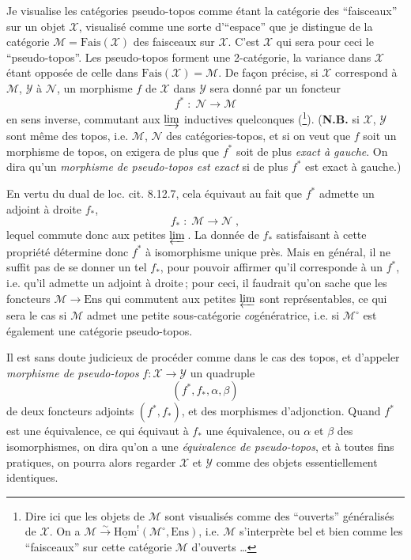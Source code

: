 \documentclass[11pt]{article}
\newcommand{\printedpage}[1]{\marginpar{\footnotesize p.~#1}}
\newcommand{\msp}[1]{\marginpar{\footnotesize [#1]}}
\newcommand{\uHom}{\underline{\mathrm{Hom}}}
\newcommand{\Ens}{\mathrm{Ens}}
\newcommand{\Fais}{\mathrm{Fais}}
\begin{document}
Je visualise les catégories pseudo-topos comme étant la catégorie des “faisceaux” sur un objet $\mathcal{X}$, visualisé comme une sorte d'“espace” que je distingue de la catégorie $\mathcal{M}=\Fais(\mathcal{X})$ des faisceaux sur $\mathcal{X}$. C'est $\mathcal{X}$ qui sera pour ceci le “pseudo-topos”. Les pseudo-topos forment une 2-catégorie, la variance dans $\mathcal{X}$ étant opposée de celle dans $\Fais(\mathcal{X})=\mathcal{M}$. De façon précise, si $\mathcal{X}$ correspond à $\mathcal{M}$, $\mathcal{Y}$ à $\mathcal{N}$, un morphisme $f$ de $\mathcal{X}$ dans $\mathcal{Y}$ sera donné par un foncteur
\[
f^* \;:\; \mathcal{N} \longrightarrow \mathcal{M}
\tag*{(4.1.1)}
\]
en sens inverse, commutant aux $\varinjlim$ inductives quelconques (\footnote{Dire ici que les objets de $\mathcal{M}$ sont visualisés comme des “ouverts” généralisés de $\mathcal{X}$. On a $\mathcal{M}\xrightarrow{\sim}\uHom^!(\mathcal{M}^\circ,\Ens)$, i.e. $\mathcal{M}$ s'interprète bel et bien comme les “faisceaux” sur cette catégorie $\mathcal{M}$ d'ouverts \ldots}). (\textbf{N.B.} si $\mathcal{X}$, $\mathcal{Y}$ sont même des topos, i.e. $\mathcal{M}$, $\mathcal{N}$ des catégories-topos, et si on veut que $f$ soit un morphisme de topos, on exigera de plus que $f^*$ soit de plus \textit{exact à gauche}. On dira qu'un \textit{morphisme de pseudo-topos est exact} si de plus $f^*$ est exact à gauche.)

\msp{page 52}
En vertu du dual de loc. cit. 8.12.7, cela équivaut au fait que $f^*$ admette un adjoint à droite $f_*$,
\[
f_* \;:\; \mathcal{M} \longrightarrow \mathcal{N}\;,
\tag*{(4.1.2)}
\]
lequel commute donc aux petites $\varprojlim$\,. La donnée de $f_*$ satisfaisant à cette propriété détermine donc $f^*$ à isomorphisme unique près. Mais en général, il ne suffit pas de se donner un tel $f_*$, pour pouvoir affirmer qu'il corresponde à un $f^*$, i.e. qu'il admette un adjoint à droite\,; pour ceci, il faudrait qu'on sache que les foncteurs $\mathcal{M}\longrightarrow\Ens$ qui commutent aux petites $\varprojlim$ sont représentables, ce qui sera le cas si $\mathcal{M}$ admet une petite sous-catégorie \textit{co}génératrice, i.e. si $\mathcal{M}^\circ$ est également une catégorie pseudo-topos. %

\newpage

\printedpage{2}

Il est sans doute judicieux de procéder comme dans le cas des topos, et d'appeler \textit{morphisme de pseudo-topos} $f:\mathcal{X}\longrightarrow\mathcal{Y}$ un quadruple
\[
(f^*,f_*,\alpha,\beta)
\tag*{(4.1.3)}
\]
\msp{page 53}
de deux foncteurs adjoints $(f^*,f_*)$, et des morphismes d'adjonction. Quand $f^*$ est une équivalence, ce qui équivaut à $f_*$ une équivalence, ou $\alpha$ et $\beta$ des isomorphismes, on dira qu'on a une \textit{équivalence de pseudo-topos}, et à toutes fins pratiques, on pourra alors regarder $\mathcal{X}$ et $\mathcal{Y}$ comme des objets essentiellement identiques.
\end{document}
